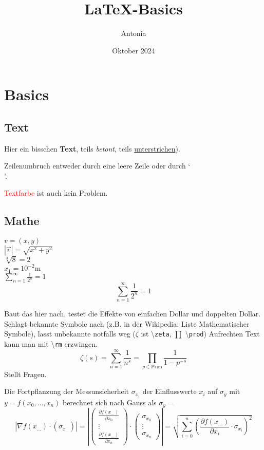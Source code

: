 \documentclass{article}
\title{\LaTeX{}-Basics}
\author{Antonia}
\date{Oktober 2024}
\begin{document}
\maketitle

\section{Basics}
\subsection{Text}
Hier ein bisschen
\textbf{Text},
teils \emph{betont},
teils \underline
{unterstrichen}).

Zeilenumbruch entweder
durch eine leere Zeile
oder durch `\\'.

\textcolor{red}{Textfarbe}
ist auch kein
{\color{blue} Problem}.

\subsection{Mathe}
$ v = (x, y) $ \\
$ |\vec{v}| = \sqrt{x^2 + y^2} $ \\
$ \sqrt[3]{8} = 2 $ \\
$ x_1 = 10^{-2}\text{m} $ \\
$ \sum_{n=1}^\infty \frac{1}{2^n} = 1 $ \\
$$ \sum_{n=1}^\infty \frac{1}{2^n} = 1 $$


Baut das hier nach, testet die Effekte von einfachen Dollar und doppelten Dollar. Schlagt bekannte Symbole nach (z.B. in der Wikipedia: Liste Mathematischer Symbole), lasst unbekannte notfalls weg ($\zeta$ ist \textbackslash\lstinline+zeta+, $\prod$ \textbackslash\lstinline+prod+) Aufrechten Text kann man mit \textbackslash\lstinline+rm+ erzwingen.
$$ \zeta(s)
	= \sum_{n=1}^\infty \frac{1}{n^s}
	= \prod_{p \in \text{Prim}} \frac{1}{1-p^{-s}}
$$
Stellt Fragen.

Die Fortpflanzung der Messunsicherheit $\sigma_{x_i}$ der Einflusswerte $x_i$ auf $\sigma_y$ mit $y = f(x_0, ..., x_n)$ berechnet sich nach {\sc Gauss} als $\sigma_y = $
$$ |\nabla f(x_{...}) \cdot (\sigma_{x_{...}})| =
\left|
	\begin{pmatrix} \frac{\partial f(x_{...})}{\partial x_0} \\ \vdots \\ \frac{\partial f(x_{...})}{\partial x_n} \end{pmatrix} \cdot
	\begin{pmatrix} \sigma_{x_0} \\ \vdots \\ \sigma_{x_n} \end{pmatrix}
\right| = \sqrt{\sum_{i=0}^n {\left(\frac{\partial f(x_{...})}{\partial x_i} \cdot \sigma_{x_i}\right)}^2} $$
\end{document}
